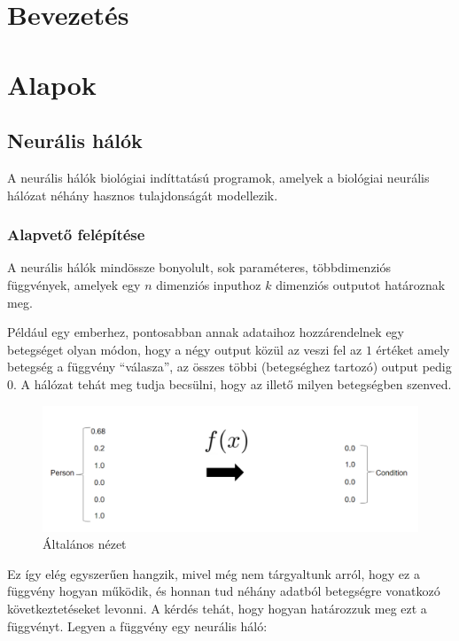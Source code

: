 \documentclass[12pt]{article}
\begin{document}
\section{Bevezetés}

\section{Alapok}


\subsection{Neurális hálók}

A neurális hálók biológiai indíttatású programok, amelyek a biológiai neurális hálózat néhány hasznos tulajdonságát modellezik.

\subsubsection{Alapvető felépítése}

A neurális hálók mindössze bonyolult, sok paraméteres, többdimenziós függvények, amelyek egy $n$ dimenziós inputhoz $k$ dimenziós outputot határoznak meg.

Például egy emberhez, pontosabban annak adataihoz hozzárendelnek egy betegséget olyan módon, hogy a négy output közül az veszi fel az $1$ értéket amely betegség a függvény “válasza”, az összes többi (betegséghez tartozó) output pedig $0$. A hálózat tehát meg tudja becsülni, hogy az illető milyen betegségben szenved.

\begin{figure}[h!]
  \includegraphics[width=\linewidth]{fgv.png}
  \caption{Általános nézet}
\end{figure}

Ez így elég egyszerűen hangzik, mivel még nem tárgyaltunk arról, hogy ez a függvény hogyan működik, és honnan tud néhány adatból betegségre vonatkozó következtetéseket levonni. A kérdés tehát, hogy hogyan határozzuk meg ezt a függvényt. Legyen a függvény egy neurális háló:
\end{document}
